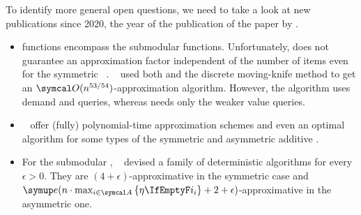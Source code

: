 To identify more general open questions, we need to take a look at new publications since 2020, the year of the publication of the paper by \citeauthor{APNSWuSVþUM}.
\begin{itemize}
	\item
	\XOS{} functions encompass the submodular functions.
	Unfortunately, \RepReMatch{} does not guarantee an approximation factor independent of the number of items even for the symmetric \XOS{} \NSW~\cite[Section 6.2]{APNSWuSVþUM}.
	~\cite{sublin_approx_algo_for_nsw_with_xos_valuations} used both \RepReMatch{} and the discrete moving-knife method to get an \(\bigo(n^{53/54})\)-approximation algorithm.
	However, the algorithm uses demand and \XOS{} queries, whereas \RepReMatch{} needs only the weaker value queries.

	\item
	~\cite{tractable_fragments_of_the_max_nsw_problem} offer (fully) polynomial-time approximation schemes and even an optimal algorithm for some types of the symmetric and asymmetric additive \NSW.

	\item
	For the submodular \NSW, \citeauthor{approx_nsw_by_matching_and_local_search}~\cite{approx_nsw_by_matching_and_local_search} devised a family of deterministic algorithms for every \(\epsilon > 0\).
	They are \((4+\epsilon)\)-approximative in the symmetric case and \(\euler(n \cdot \max_{i \in \agents} \,\braces{\weight} + 2 + \epsilon)\)-approximative in the asymmetric one.



\end{itemize}
